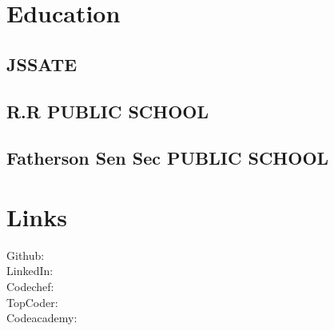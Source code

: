 \documentclass[]{deedy-resume-openfont}
\begin{document}
%
%



%
%

\begin{minipage}[t]{0.33\textwidth} 


\section{Education} 

\subsection{JSSATE}
\sectionsep


\subsection{R.R PUBLIC SCHOOL}
\sectionsep

\subsection{Fatherson Sen Sec PUBLIC SCHOOL}
\sectionsep


\section{Links} 

Github: \href{https://github.com/Deshwal36}{} \\
LinkedIn: \href{https://www.linkedin.com/in/shivam-deshwal-ba9a6bb6/}{} \\
Codechef: \href{https://www.codechef.com/users/deshwal}{} \\
TopCoder: \href{https://www.topcoder.com/members/Deshwal}{} \\
Codeacademy: \href{https://www.codecademy.com/shivam.deshwal36}{} \\


\end{minipage}
\end{document}
